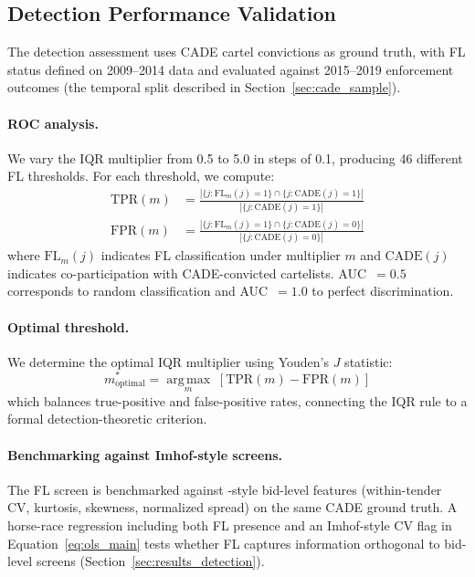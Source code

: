 
\subsection{Detection Performance Validation}
\label{sec:detection_validation}

The detection assessment uses CADE cartel convictions as ground truth,
with FL status defined on 2009--2014 data and evaluated against
2015--2019 enforcement outcomes (the temporal split described in
Section~\ref{sec:cade_sample}).

\paragraph{ROC analysis.}
We vary the IQR multiplier from 0.5 to 5.0 in steps of 0.1, producing
46 different FL thresholds. For each threshold, we compute:
\begin{align}
  \text{TPR}(m) &= \frac{|\{j : \text{FL}_m(j)=1\} \cap
    \{j : \text{CADE}(j)=1\}|}{|\{j : \text{CADE}(j)=1\}|}
  \label{eq:tpr} \\
  \text{FPR}(m) &= \frac{|\{j : \text{FL}_m(j)=1\} \cap
    \{j : \text{CADE}(j)=0\}|}{|\{j : \text{CADE}(j)=0\}|}
  \label{eq:fpr}
\end{align}
where $\text{FL}_m(j)$ indicates FL classification under multiplier $m$
and $\text{CADE}(j)$ indicates co-participation with CADE-convicted
cartelists. AUC~$= 0.5$ corresponds to random classification and
AUC~$= 1.0$ to perfect discrimination.

\paragraph{Optimal threshold.}
We determine the optimal IQR multiplier using Youden's $J$
statistic:
\begin{equation}
  m^*_{\text{optimal}} = \operatorname*{arg\,max}_m \;
  \left[\text{TPR}(m) - \text{FPR}(m)\right]
  \label{eq:youden}
\end{equation}
which balances true-positive and false-positive rates, connecting the
IQR rule to a formal detection-theoretic criterion.

\paragraph{Benchmarking against Imhof-style screens.}
The FL screen is benchmarked against \citet{imhof2019detecting}-style
bid-level features (within-tender CV, kurtosis, skewness, normalized
spread) on the same CADE ground truth. A horse-race regression
including both FL presence and an Imhof-style CV flag in
Equation~\eqref{eq:ols_main} tests whether FL captures information
orthogonal to bid-level screens
(Section~\ref{sec:results_detection}).

